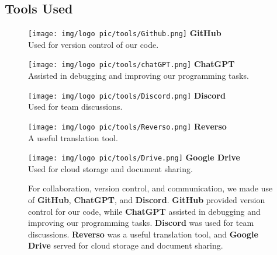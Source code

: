 \newpage

\subsection{Tools Used}
\begin{figure}[htbp]
    \centering
    \begin{minipage}{0.2\textwidth}
        \centering
        \texttt{[image: img/logo pic/tools/Github.png]}
        \vspace{0.3cm}
        \textbf{GitHub}\\
        \small{Used for version control of our code.}
    \end{minipage}%
    \hfill
    \begin{minipage}{0.2\textwidth}
        \centering
        \texttt{[image: img/logo pic/tools/chatGPT.png]}
        \vspace{0.3cm}
        \textbf{ChatGPT}\\
        \small{Assisted in debugging and improving our programming tasks.}
    \end{minipage}%
    \hfill
    \begin{minipage}{0.2\textwidth}
        \centering
        \texttt{[image: img/logo pic/tools/Discord.png]}
        \vspace{0.3cm}
        \textbf{Discord}\\
        \small{Used for team discussions.}
    \end{minipage}%
    \hfill
    \begin{minipage}{0.2\textwidth}
        \centering
        \texttt{[image: img/logo pic/tools/Reverso.png]}
        \vspace{0.3cm}
        \textbf{Reverso}\\
        \small{A useful translation tool.}
    \end{minipage}%
    \hfill
    \begin{minipage}{0.2\textwidth}
        \centering
        \texttt{[image: img/logo pic/tools/Drive.png]}
        \vspace{0.3cm}
        \textbf{Google Drive}\\
        \small{Used for cloud storage and document sharing.}
    \end{minipage}
    
    \vspace{0.5cm}
    \noindent
   For collaboration, version control, and communication, we made use of \textbf{GitHub}, \textbf{ChatGPT}, and \textbf{Discord}. \textbf{GitHub} provided version control for our code, while \textbf{ChatGPT} assisted in debugging and improving our programming tasks. \textbf{Discord} was used for team discussions. \textbf{Reverso} was a useful translation tool, and \textbf{Google Drive} served for cloud storage and document sharing.
\end{figure}



